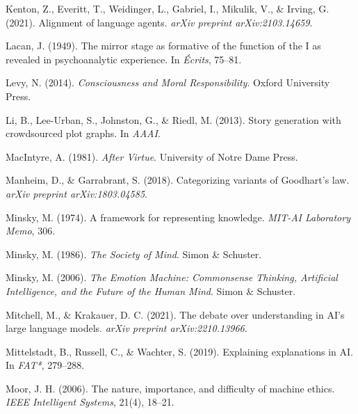 \documentclass[12pt]{article}
\begin{document}
\begin{thebibliography}{99}
Kenton, Z., Everitt, T., Weidinger, L., Gabriel, I., Mikulik, V., \& Irving, G. (2021).
\newblock Alignment of language agents.
\newblock \textit{arXiv preprint arXiv:2103.14659}.

Lacan, J. (1949).
\newblock The mirror stage as formative of the function of the I as revealed in psychoanalytic experience.
\newblock In \textit{Écrits}, 75--81.

Levy, N. (2014).
\newblock \textit{Consciousness and Moral Responsibility}.
\newblock Oxford University Press.

Li, B., Lee-Urban, S., Johnston, G., \& Riedl, M. (2013).
\newblock Story generation with crowdsourced plot graphs.
\newblock In \textit{AAAI}.

MacIntyre, A. (1981).
\newblock \textit{After Virtue}.
\newblock University of Notre Dame Press.

Manheim, D., \& Garrabrant, S. (2018).
\newblock Categorizing variants of Goodhart's law.
\newblock \textit{arXiv preprint arXiv:1803.04585}.

Minsky, M. (1974).
\newblock A framework for representing knowledge.
\newblock \textit{MIT-AI Laboratory Memo}, 306.

Minsky, M. (1986).
\newblock \textit{The Society of Mind}.
\newblock Simon \& Schuster.

Minsky, M. (2006).
\newblock \textit{The Emotion Machine: Commonsense Thinking, Artificial Intelligence, and the Future of the Human Mind}.
\newblock Simon \& Schuster.

Mitchell, M., \& Krakauer, D. C. (2021).
\newblock The debate over understanding in AI's large language models.
\newblock \textit{arXiv preprint arXiv:2210.13966}.

Mittelstadt, B., Russell, C., \& Wachter, S. (2019).
\newblock Explaining explanations in AI.
\newblock In \textit{FAT*}, 279--288.

Moor, J. H. (2006).
\newblock The nature, importance, and difficulty of machine ethics.
\newblock \textit{IEEE Intelligent Systems}, 21(4), 18--21.


\end{thebibliography}
\end{document}
